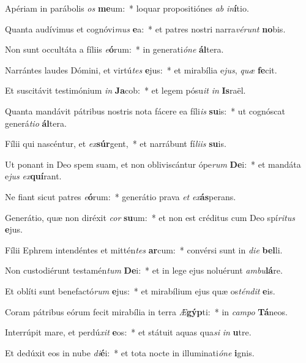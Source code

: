 \item Apériam in parábolis \textit{os} \textbf{me}um:~* loquar propositiónes \textit{ab} \textit{in}\textbf{í}tio.
\item Quanta audívimus et cognóvi\textit{mus} \textbf{e}a:~* et patres nostri narra\textit{vé}\textit{runt} \textbf{no}bis.
\item Non sunt occultáta a fíliis \textit{e}\textbf{ó}rum:~* in generati\textit{ó}\textit{ne} \textbf{ál}tera.
\item Narrántes laudes Dómini, et virtú\textit{tes} \textbf{e}jus:~* et mirabília e\textit{jus}, \textit{quæ} \textbf{fe}cit.
\item Et suscitávit testimónium \textit{in} \textbf{Ja}cob:~* et legem pósu\textit{it} \textit{in} \textbf{Is}raël.
\item Quanta mandávit pátribus nostris nota fácere ea fíli\textit{is} \textbf{su}is:~* ut cognóscat generá\textit{ti}\textit{o} \textbf{ál}tera.
\item Fílii qui nascéntur, et \textit{ex}\textbf{súr}gent,~* et narrábunt fí\textit{li}\textit{is} \textbf{su}is.
\item Ut ponant in Deo spem suam, et non obliviscántur ópe\textit{rum} \textbf{De}i:~* et mandáta e\textit{jus} \textit{ex}\textbf{quí}rant.
\item Ne fiant sicut patres \textit{e}\textbf{ó}rum:~* generátio prava \textit{et} \textit{ex}\textbf{ás}perans.
\item Generátio, quæ non diréxit \textit{cor} \textbf{su}um:~* et non est créditus cum Deo spí\textit{ri}\textit{tus} \textbf{e}jus.
\item Fílii Ephrem intendéntes et mittén\textit{tes} \textbf{ar}cum:~* convérsi sunt in \textit{di}\textit{e} \textbf{bel}li.
\item Non custodiérunt testamén\textit{tum} \textbf{De}i:~* et in lege ejus noluérunt \textit{am}\textit{bu}\textbf{lá}re.
\item Et oblíti sunt benefactó\textit{rum} \textbf{e}jus:~* et mirabílium ejus quæ os\textit{tén}\textit{dit} \textbf{e}is.
\item Coram pátribus eórum fecit mirabília in terra \textit{Æ}\textbf{gýp}ti:~* in \textit{cam}\textit{po} \textbf{Tá}neos.
\item Interrúpit mare, et perdú\textit{xit} \textbf{e}os:~* et státuit aquas qua\textit{si} \textit{in} \textbf{u}tre.
\item Et dedúxit eos in nube \textit{di}\textbf{é}i:~* et tota nocte in illuminati\textit{ó}\textit{ne} \textbf{i}gnis.
